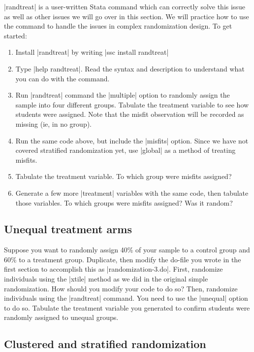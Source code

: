 \documentclass{tufte-handout}
\begin{document}
|randtreat| is a user-written Stata command
which can correctly solve this issue
as well as other issues we will go over in this section.
We will practice how to use the command
to handle the issues in complex randomization design. To get started:
\begin{enumerate}
  \item Install |randtreat| by writing |ssc install randtreat|
  \item Type |help randtreat|. Read the syntax and description
  to understand what you can do with the command.
  \item Run |randtreat| command the |multiple| option
  to randomly assign the sample into four different groups.
  Tabulate the treatment variable to see how students were assigned.
  Note that the misfit observation will be recorded as missing (ie, in no group).
  \item Run the same code above,
  but include the |misfits| option. Since we have not covered
  stratified randomization yet, use |global| as a method of treating misfits.
  \item Tabulate the treatment variable. To which group were misfits assigned?
  \item Generate a few more |treatment| variables with the same code,
  then tabulate those variables. To which groups were misfits assigned?
  Was it random?
\end{enumerate}

\subsection{Unequal treatment arms}

Suppose you want to randomly assign 40\% of your sample
to a control group and 60\% to a treatment group.
Duplicate, then modify the do-file you wrote
in the first section to accomplish this as |randomization-3.do|.
First, randomize individuals using the |xtile| method
as we did in the original simple randomization.
How should you modify your code to do so?
Then, randomize individuals using the |randtreat| command.
You need to use the |unequal| option to do so.
Tabulate the treatment variable you generated
to confirm students were randomly assigned to unequal groups.

\subsection{Clustered and stratified randomization}
\end{document}
